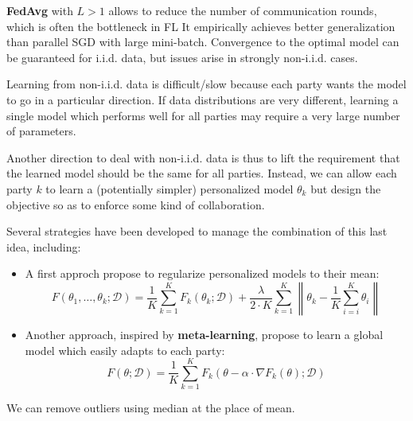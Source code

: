 \textbf{FedAvg} with $L > 1$ allows to reduce the number of communication rounds, which is often the bottleneck in FL
It empirically achieves better generalization than parallel SGD with large mini-batch. Convergence to the optimal model can be guaranteed for i.i.d. data, but issues arise in strongly non-i.i.d. cases.

Learning from non-i.i.d. data is difficult/slow because each party wants the model to go in a particular direction. If
data distributions are very different, learning a single model which performs well for all parties may require a very 
large number of parameters.

Another direction to deal with non-i.i.d. data is thus to lift the requirement that the learned model should be the same
for all parties. Instead, we can allow each party $k$ to learn a (potentially simpler) personalized model $\theta_k$	
but design the objective so as to enforce some kind of collaboration.

Several strategies have been developed to manage the combination of this last idea, including:
\begin{itemize}
    \item A first approch propose to regularize personalized models to their mean:
        \begin{equation}
            F(\theta_1, \dots, \theta_k; \mathcal{D}) = \frac{1}{K} \sum_{k = 1}^K F_k(\theta_k; \mathcal{D}) + \frac{\lambda}{2 \cdot K} \sum_{k = 1}^K \left\|\theta_k - \frac{1}{K} \sum_{i = i}^K \theta_i\right\|
        \end{equation}
    \item Another approach, inspired by \textbf{meta-learning}, propose to learn a global model which 
        easily adapts to each party:
        \begin{equation}
            F(\theta; \mathcal{D}) = \frac{1}{K} \sum_{k = 1}^K F_k(\theta - \alpha \cdot \nabla F_k(\theta); \mathcal{D})
        \end{equation}
\end{itemize}

We can remove outliers using median at the place of mean.